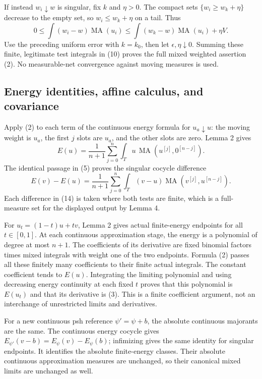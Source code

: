 \documentclass[
]{article}
\begin{document}
If instead \(w_i\downarrow w\) is singular, fix \(k\) and \(\eta>0\).
The compact sets \(\{w_i\geq w_k+\eta\}\) decrease to the empty set, so
\(w_i\leq w_k+\eta\) on a tail. Thus \[
0\leq\int(w_i-w)\operatorname{MA}(u_i)
\leq\int(w_k-w)\operatorname{MA}(u_i)+\eta V.
\] Use the preceding uniform error with \(k=k_0\), then let
\(\epsilon,\eta\downarrow0\). Summing these finite, legitimate test
integrals in (10) proves the full mixed weighted assertion (2). No
measurable-net convergence against moving measures is used.

\subsection{Energy identities, affine calculus, and
covariance}\label{energy-identities-affine-calculus-and-covariance}

Apply (2) to each term of the continuous energy formula for
\(u_a\downarrow u\): the moving weight is \(u_a\), the first \(j\) slots
are \(u_a\), and the other slots are zero. Lemma 2 gives \[
E(u)=\frac1{n+1}\sum_{j=0}^n\int_Tu\,\operatorname{MA}(u^{[j]},0^{[n-j]}).
\tag{13}
\] The identical passage in (5) proves the singular cocycle difference
\[
E(v)-E(u)=\frac1{n+1}\sum_{j=0}^n\int_T(v-u)\operatorname{MA}(v^{[j]},u^{[n-j]}).
\tag{14}
\] Each difference in (14) is taken where both tests are finite, which
is a full-measure set for the displayed output by Lemma 4.

For \(u_t=(1-t)u+tv\), Lemma 2 gives actual finite-energy endpoints for
all \(t\in[0,1]\). At each continuous approximation stage, the energy is
a polynomial of degree at most \(n+1\). The coefficients of its
derivative are fixed binomial factors times mixed integrals with weight
one of the two endpoints. Formula (2) passes all these finitely many
coefficients to their finite actual integrals. The constant coefficient
tends to \(E(u)\). Integrating the limiting polynomial and using
decreasing energy continuity at each fixed \(t\) proves that this
polynomial is \(E(u_t)\) and that its derivative is (3). This is a
finite coefficient argument, not an interchange of unrestricted limits
and derivatives.

For a new continuous psh reference \(\psi'=\psi+b\), the absolute
continuous majorants are the same. The continuous energy cocycle gives
\(E_{\psi'}(v-b)=E_\psi(v)-E_\psi(b)\); infimizing gives the same
identity for singular endpoints. It identifies the absolute
finite-energy classes. Their absolute continuous approximation measures
are unchanged, so their canonical mixed limits are unchanged as well.
\end{document}
